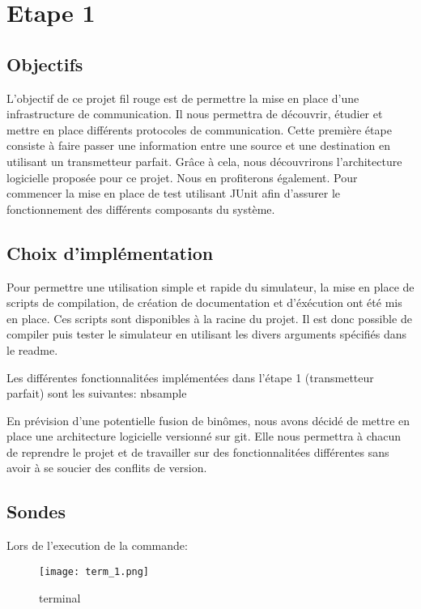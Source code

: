 \section{Etape 1}
\subsection{Objectifs}

L'objectif de ce projet fil rouge est de permettre la mise en place d'une infrastructure de communication.
Il nous permettra de découvrir, étudier et mettre en place différents protocoles de communication. Cette première étape
consiste à faire passer une information entre une source et une destination en utilisant
un transmetteur parfait. Grâce à cela, nous découvrirons l'architecture logicielle proposée pour ce projet. Nous en profiterons également.
Pour commencer la mise en place de test utilisant JUnit afin d'assurer le fonctionnement des différents composants du système.

\subsection{Choix d'implémentation}

Pour permettre une utilisation simple et rapide du simulateur, la mise en place de scripts de compilation, de création de documentation et d'éxécution
ont été mis en place. Ces scripts sont disponibles à la racine du projet.
Il est donc possible de compiler puis tester le simulateur en utilisant les divers arguments spécifiés dans le readme.

Les différentes fonctionnalitées implémentées dans l'étape 1 (transmetteur parfait) sont les suivantes:
nbsample

En prévision d'une potentielle fusion de binômes, nous avons décidé de mettre en place une architecture logicielle versionné sur git.
Elle nous permettra à chacun de reprendre le projet et de travailler sur des fonctionnalitées différentes sans avoir à se soucier des conflits de version.

\pagebreak

\subsection{Sondes}

Lors de l'execution de la commande: 

\begin{figure}[h]
    \centering
    \texttt{[image: term\_1.png]}
    \caption{terminal}
\end{figure}

